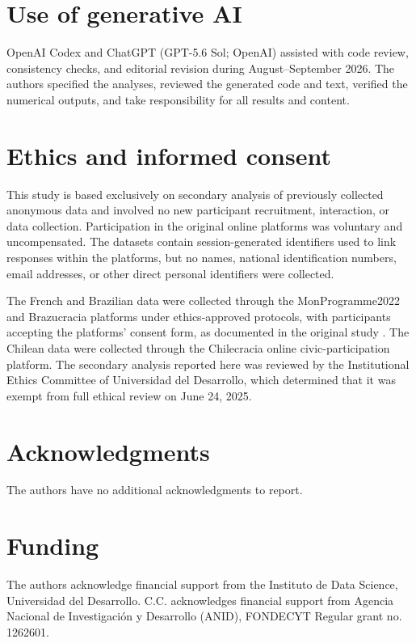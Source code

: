 \documentclass[unnumsec,webpdf,modern,large]{oup-authoring-template}
\begin{document}
\section*{Use of generative AI}

OpenAI Codex and ChatGPT (GPT-5.6 Sol; OpenAI) assisted with code review, consistency checks, and editorial revision during August–September 2026. The authors specified the analyses, reviewed the generated code and text, verified the numerical outputs, and take responsibility for all results and content.

\section*{Ethics and informed consent}

This study is based exclusively on secondary analysis of previously collected anonymous data and involved no new participant recruitment, interaction, or data collection. Participation in the original online platforms was voluntary and uncompensated. The datasets contain session-generated identifiers used to link responses within the platforms, but no names, national identification numbers, email addresses, or other direct personal identifiers were collected.

The French and Brazilian data were collected through the MonProgramme2022 and Brazucracia platforms under ethics-approved protocols, with participants accepting the platforms' consent form, as documented in the original study \citep{Navarrete2024}. The Chilean data were collected through the Chilecracia online civic-participation platform. The secondary analysis reported here was reviewed by the Institutional Ethics Committee of Universidad del Desarrollo, which determined that it was exempt from full ethical review on June 24, 2025.

\section*{Acknowledgments}

The authors have no additional acknowledgments to report.

\section*{Funding}

The authors acknowledge financial support from the Instituto de Data Science, Universidad del Desarrollo. C.C. acknowledges financial support from Agencia Nacional de Investigación y Desarrollo (ANID), FONDECYT Regular grant no. 1262601.
\end{document}
